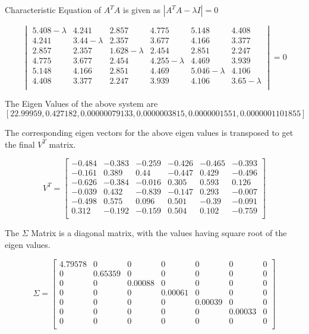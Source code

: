 \documentclass{article}
\begin{document}
Characteristic Equation of $A^TA$ is given as $|A^TA - \lambda I| = 0$

$$
\begin{vmatrix}
5.408-\lambda & 4.241 & 2.857 & 4.775 & 5.148 & 4.408\\
4.241 & 3.44-\lambda  & 2.357 & 3.677 & 4.166 & 3.377\\
2.857 & 2.357 & 1.628-\lambda & 2.454 & 2.851 & 2.247\\
4.775 & 3.677 & 2.454 & 4.255-\lambda & 4.469 & 3.939\\
5.148 & 4.166 & 2.851 & 4.469 & 5.046-\lambda & 4.106\\
4.408 & 3.377 & 2.247 & 3.939 & 4.106 & 3.65-\lambda\\
\end{vmatrix} = 0
$$

The Eigen Values of the above system are
$$
[22.99959, 0.427182, 0.00000079133, 0.0000003815, 0.0000001551, 0.0000001101855]
$$

The corresponding eigen vectors for the above eigen values is transposed to get the final $V^T$ matrix.

$$
V^T = 
\begin{bmatrix}
-0.484 & -0.383 & -0.259 & -0.426 & -0.465 & -0.393\\
-0.161 &  0.389 &  0.44  & -0.447 &  0.429 & -0.496\\
-0.626 & -0.384 & -0.016 &  0.305 &  0.593 &  0.126\\
-0.039 &  0.432 & -0.839 & -0.147 &  0.293 & -0.007\\
-0.498 &  0.575 &  0.096 &  0.501 & -0.39  & -0.091\\
0.312  & -0.192 & -0.159 &  0.504 &  0.102 & -0.759\\
\end{bmatrix}
$$

The $\Sigma$ Matrix is a diagonal matrix, with the values having square root of the eigen values.



$$
\Sigma = 
\begin{bmatrix}
4.79578 & 0 & 0 & 0 & 0 & 0 & 0\\
0 & 0.65359 & 0 & 0 & 0 & 0 & 0\\
0 & 0 & 0.00088 & 0 & 0 & 0 & 0\\
0 & 0 & 0 & 0.00061 & 0 & 0 & 0\\
0 & 0 & 0 & 0 & 0.00039 & 0 & 0\\
0 & 0 & 0 & 0 & 0 & 0.00033 & 0\\
0 & 0 & 0 & 0 & 0 & 0 & 0\\
\end{bmatrix}
$$
\end{document}
